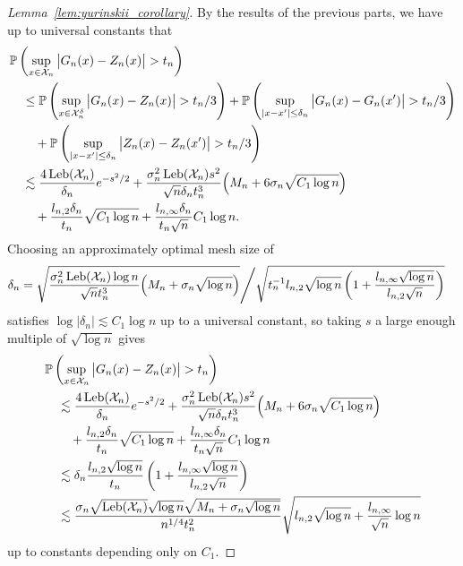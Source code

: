 \begin{proof}[Lemma~\ref{lem:yurinskii_corollary}]

  By the results of the previous parts,
  we have up to universal constants that
  \begin{align*}
    &\mathbb{P}\left(
      \sup_{x \in \mathcal{X}_n}
      \big|
      G_n(x) - Z_n(x)
      \big|
      > t_n
    \right) \\
    &\quad\leq
    \mathbb{P}\left(
      \sup_{x \in \mathcal{X}_n^\delta}
      \big|
      G_n(x) - Z_n(x)
      \big|
      > t_n / 3
    \right)
    + \mathbb{P}\left(
      \sup_{|x-x'| \leq \delta_n}
      \big|
      G_n(x) - G_n(x')
      \big|
      > t_n / 3
    \right) \\
    &\qquad+
    \mathbb{P}\left(
      \sup_{|x - x'| \leq \delta_n}
      \big|
      Z_n(x) - Z_n(x')
      \big|
      > t_n / 3
    \right) \\
    &\quad\lesssim
    \frac{4 \operatorname{Leb}(\mathcal{X}_n)}{\delta_n}
    e^{-s^2/2}
    + \frac{\sigma_n^2 \operatorname{Leb}(\mathcal{X}_n) s^2}{\sqrt n \delta_n t_n^3}
    \Big(M_n + 6 \sigma_n \sqrt{C_1 \log n}\Big) \\
    &\qquad+
    \frac{l_{n,2} \delta_n}{t_n}
    \sqrt{C_1 \log n}
    + \frac{l_{n,\infty} \delta_n}{t_n \sqrt n} C_1 \log n.
  \end{align*}
  Choosing an approximately optimal mesh size of
  \begin{align*}
    \delta_n
    &=
    \sqrt{
      \frac{\sigma_n^2 \operatorname{Leb}(\mathcal{X}_n) \log n}{\sqrt n t_n^3}
      \Big(M_n + \sigma_n \sqrt{\log n}\Big)
    } \Bigg/
    \sqrt{
      t_n^{-1}
      l_{n,2}
      \sqrt{\log n}
      \left(
        1 + \frac{l_{n,\infty} \sqrt{\log n}}{l_{n,2} \sqrt{n}}
      \right)
    }
  \end{align*}
  satisfies $\log |\delta_n| \lesssim C_1 \log n$
  up to a universal constant,
  so taking $s$ a large enough multiple of $\sqrt{\log n}$ gives
  \begin{align*}
    &\mathbb{P}\left(
      \sup_{x \in \mathcal{X}_n}
      \big|
      G_n(x) - Z_n(x)
      \big|
      > t_n
    \right) \\
    &\quad\lesssim
    \frac{4 \operatorname{Leb}(\mathcal{X}_n)}{\delta_n}
    e^{-s^2/2}
    + \frac{\sigma_n^2 \operatorname{Leb}(\mathcal{X}_n) s^2}{\sqrt n \delta_n t_n^3}
    \Big(M_n + 6 \sigma_n \sqrt{C_1 \log n}\Big) \\
    &\qquad+
    \frac{l_{n,2} \delta_n}{t_n}
    \sqrt{C_1 \log n}
    + \frac{l_{n,\infty} \delta_n}{t_n \sqrt n} C_1 \log n \\
    &\quad\lesssim
    \delta_n
    \frac{l_{n,2} \sqrt {\log n}}{t_n}
    \left( 1 + \frac{l_{n,\infty} \sqrt{\log n}}{l_{n,2} \sqrt n} \right) \\
    &\quad\lesssim
    \frac{\sigma_n \sqrt{\operatorname{Leb}(\mathcal{X}_n)} \sqrt{\log n}
    \sqrt{M_n + \sigma_n \sqrt{\log n}}}
    {n^{1/4} t_n^2}
    \sqrt{l_{n,2} \sqrt {\log n}
    + \frac{l_{n,\infty}}{\sqrt n} \log n}
  \end{align*}
  up to constants depending only on $C_1$.
\end{proof}


